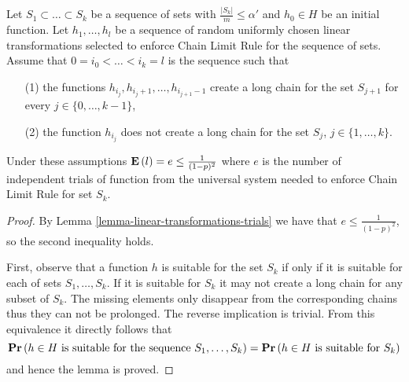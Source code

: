 \documentclass[runningheads,a4paper]{llncs}
\begin{document}
\begin{lemma}
\label{lemma-sets}
Let $S_1 \subset \dots \subset S_k$ be a sequence of sets with $\frac{|S_k|}{m} \leq \alpha'$ and $h_0 \in H$ be an initial function. Let $h_1, \dots, h_l$ be a sequence of random uniformly chosen linear transformations selected to enforce Chain Limit Rule for the sequence of sets. Assume that $0 = i_0 < \dots < i_k = l$ is the sequence such that 
\begin{enumerate}
\item[(1)] the functions $h_{i_{j}}, h_{i_{j} + 1}, \dots, h_{i_{j + 1} - 1}$ create a long chain for the set $S_{j + 1}$ for every $j \in \{0, \dots, k - 1 \}$,
\item[(2)] the function $h_{i_{j}}$ does not create a long chain for the set $S_j$, $j \in \{1, \dots, k\}$.
\end{enumerate}
Under these assumptions $\mathbf{E}\left(l\right) = e \leq \frac{1}{(1 - p) ^ 2}$ where $e$ is the number of independent trials of function from the universal system needed to enforce Chain Limit Rule for set $S_k$.
\end{lemma}
\begin{proof}
By Lemma \ref{lemma-linear-transformations-trials} we have that $e \leq \frac{1}{(1 - p) ^ 2}$, so the second inequality holds.

First, observe that a function $h$ is suitable for the set $S_k$ if only if it is suitable for each of sets $S_1, \dots, S_k$. If it is suitable for $S_k$ it may not create a long chain for any subset of $S_k$. The missing elements only disappear from the corresponding chains thus they can not be prolonged. The reverse implication is trivial. From this equivalence it directly follows that $$\mathbf{Pr}\left(h \in H \text{ is suitable for the sequence } S_1, \dots, S_k\right) = \mathbf{Pr}\left(h \in H \text{ is suitable for } S_k\right)$$ and hence the lemma is proved.
\end{proof}
\end{document}
